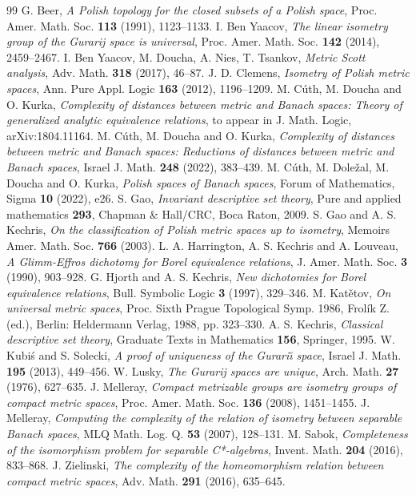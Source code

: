 \documentclass[a4paper]{amsart}
\theoremstyle{plain}
\theoremstyle{remark}
\begin{document}
\begin{thebibliography}{99}
 G. Beer, \emph{A Polish topology for the closed subsets of a Polish space}, Proc. Amer. Math. Soc. {\bf 113} (1991), 1123--1133.
 I. Ben Yaacov, \emph{The linear isometry group of the Gurarij space is universal}, Proc. Amer. Math. Soc. {\bf 142} (2014), 2459--2467.
 I. Ben Yaacov, M. Doucha, A. Nies, T. Tsankov, \emph{Metric Scott analysis}, Adv. Math. {\bf 318} (2017), 46--87.
 J. D. Clemens, \emph{Isometry of Polish metric spaces}, Ann. Pure Appl. Logic {\bf 163} (2012), 1196--1209.
 M. C\'{u}th, M. Doucha and O. Kurka, \emph{Complexity of distances between metric and Banach spaces: Theory of generalized analytic equivalence relations}, to appear in J. Math. Logic, arXiv:1804.11164.
 M. C\'{u}th, M. Doucha and O. Kurka, \emph{Complexity of distances between metric and Banach spaces: Reductions of distances between metric and Banach spaces}, Israel J. Math. {\bf 248} (2022), 383--439.
 M. C\'{u}th, M. Dole\v{z}al, M. Doucha and O. Kurka, \emph{Polish spaces of Banach spaces}, Forum of Mathematics, Sigma {\bf 10} (2022), e26.
 S. Gao, \emph{Invariant descriptive set theory}, Pure and applied mathematics {\bf 293}, Chapman \& Hall/CRC, Boca Raton, 2009.
 S. Gao and A. S. Kechris, \emph{On the classification of Polish metric spaces up to isometry}, Memoirs Amer. Math. Soc. {\bf 766} (2003).
 L. A. Harrington, A. S. Kechris and A. Louveau, \emph{A Glimm-Effros dichotomy for Borel equivalence relations}, J. Amer. Math. Soc. {\bf 3} (1990), 903--928.
 G. Hjorth and A. S. Kechris, \emph{New dichotomies for Borel equivalence relations}, Bull. Symbolic Logic {\bf 3} (1997), 329--346.
 M. Kat\v{e}tov, \emph{On universal metric spaces}, Proc. Sixth Prague Topological Symp. 1986, Frol\'{i}k Z. (ed.), Berlin: Heldermann Verlag, 1988, pp. 323--330.
 A. S. Kechris, \emph{Classical descriptive set theory}, Graduate Texts in Mathematics {\bf 156}, Springer, 1995.
 W. Kubi\'s and S. Solecki, \emph{A proof of uniqueness of the Gurari\u{\i} space}, Israel J. Math. {\bf 195} (2013), 449--456.
 W. Lusky, \emph{The Gurarij spaces are unique}, Arch. Math. {\bf 27} (1976), 627--635.
 J. Melleray, \emph{Compact metrizable groups are isometry groups of compact metric spaces}, Proc. Amer. Math. Soc. {\bf 136} (2008), 1451--1455.
 J. Melleray, \emph{Computing the complexity of the relation of isometry between separable Banach spaces}, MLQ Math. Log. Q. {\bf 53} (2007), 128--131.
 M. Sabok, \emph{Completeness of the isomorphism problem for separable C*-algebras}, Invent. Math. {\bf 204} (2016), 833--868.
 J. Zielinski, \emph{The complexity of the homeomorphism relation between compact metric spaces}, Adv. Math. {\bf 291} (2016), 635--645.
\end{thebibliography}
\end{document}
